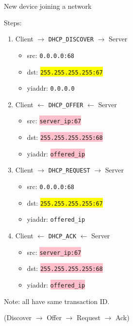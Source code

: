 \begin{theorem}
    {New device joining a network}

    Steps:
    \begin{enumerate}
        \item Client $\rightarrow$ \texttt{DHCP\_DISCOVER} $\rightarrow$ Server
              \begin{itemize}
                  \item src: \texttt{0.0.0.0:68}
                  \item dst: \colorbox{yellow}{\texttt{255.255.255.255:67}}
                  \item yiaddr: \texttt{0.0.0.0}
              \end{itemize}
        \item Client $\leftarrow$ \texttt{DHCP\_OFFER} $\leftarrow$ Server
              \begin{itemize}
                  \item src: \colorbox{pink}{\texttt{server\_ip:67}}
                  \item dst: \colorbox{pink}{\texttt{255.255.255.255:68}}
                  \item yiaddr: \colorbox{pink}{\texttt{offered\_ip}}
              \end{itemize}
        \item Client $\rightarrow$ \texttt{DHCP\_REQUEST} $\rightarrow$ Server
              \begin{itemize}
                  \item src: \texttt{0.0.0.0:68}
                  \item dst: \colorbox{yellow}{\texttt{255.255.255.255:67}}
                  \item yiaddr: \texttt{offered\_ip}
              \end{itemize}
        \item Client $\leftarrow$ \texttt{DHCP\_ACK} $\leftarrow$ Server
              \begin{itemize}
                  \item src: \colorbox{pink}{\texttt{server\_ip:67}}
                  \item dst: \colorbox{pink}{\texttt{255.255.255.255:68}}
                  \item yiaddr: \colorbox{pink}{\texttt{offered\_ip}}
              \end{itemize}
    \end{enumerate}

    Note: all have same transaction ID.

    (Discover $\to$ Offer $\to$ Request $\to$ Ack)
\end{theorem}

